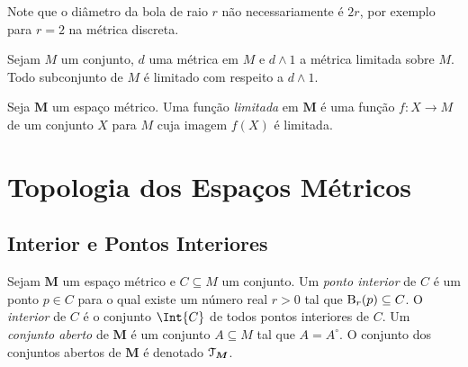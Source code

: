 Note que o diâmetro da bola de raio $r$ não necessariamente é $2r$, por exemplo para $r=2$ na métrica discreta.

\begin{exerc}
Sejam $M$ um conjunto, $d$ uma métrica em $M$ e $d \wedge 1$ a métrica limitada sobre $M$. Todo subconjunto de $M$ é limitado com respeito a $d \wedge 1$.
\end{exerc}

\begin{defi}
Seja $\bm M$ um espaço métrico. Uma função \emph{limitada} em $\bm M$ é uma função $f\colon X \to M$ de um conjunto $X$ para $M$ cuja imagem $f(X)$ é limitada.
\end{defi}

\section{Topologia dos Espaços Métricos}

\subsection{Interior e Pontos Interiores}

\begin{defi}
Sejam $\bm M$ um espaço métrico e $C \subseteq M$ um conjunto. Um \emph{ponto interior} de $C$ é um ponto $p \in C$ para o qual existe um número real $r > 0$ tal que $\mathrm{B}_r(p) \subseteq C$. O \emph{interior} de $C$ é o conjunto $\Int{C}$ de todos pontos interiores de $C$. Um \emph{conjunto aberto} de $\bm M$ é um conjunto $A \subseteq M$ tal que $A = A^\circ$. O conjunto dos conjuntos abertos de $\bm M$ é denotado $\mathcal{T}_{\bm M}$.
\end{defi}

